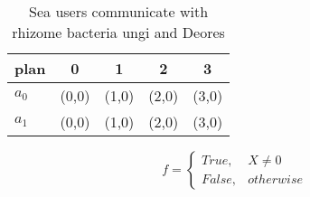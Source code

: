 \documentclass[a4paper]{article}
\begin{document}
\begin{table}
\begin{adjustbox}{width=0.5\columnwidth}
\begin{tabular}{|l|l|l|l|l|}
\hline
\textbf{plan} & \multicolumn{1}{c|}{\textbf{0}} & \multicolumn{1}{c|}{\textbf{1}} & \multicolumn{1}{c|}{\textbf{2}} & \multicolumn{1}{c|}{\textbf{3}} \\ \hline
\textbf{$a_0$}  & (0,0) & (1,0) & (2,0) & (3,0) \\ \hline
\textbf{$a_1$}  & (0,0) & (1,0) & (2,0) & (3,0) \\ \hline
\end{tabular}
\end{adjustbox}
\caption{Sea users communicate with rhizome bacteria ungi and Deores
}
\end{table}

\begin{equation}   f =
\begin{cases} True, & X \neq 0\\
False, & otherwise
\end{cases}
\end{equation}
\end{document}

